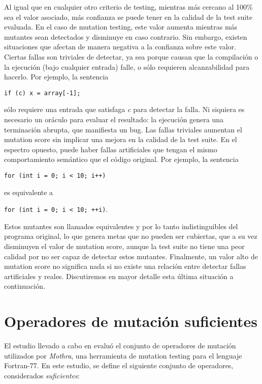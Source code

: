 Al igual que en cualquier otro criterio de testing, mientras m\'as cercano al 100\% sea el valor asociado, m\'as confianza se puede tener en la calidad de la test suite evaluada. En el caso de mutation testing, este valor aumenta mientras m\'as mutantes sean detectados y disminuye en caso contrario. Sin embargo, existen situaciones que afectan de manera negativa a la confianza sobre este valor. Ciertas fallas son triviales de detectar, ya sea porque causan que la compilaci\'on o la ejecuci\'on (bajo cualquier entrada) falle, o s\'olo requieren alcanzabilidad para hacerlo. Por ejemplo, la sentencia

 \lstinline|if (c) x = array[-1];| 

\noindent
s\'olo requiere una entrada que satisfaga \emph{c} para detectar la falla. Ni siquiera es necesario un or\'aculo para evaluar el resultado: la ejecuci\'on genera una terminaci\'on abrupta, que manifiesta un bug. Las fallas triviales aumentan el mutation score sin implicar una mejora en la calidad de la test suite. En el espectro opuesto, puede haber fallas artificiales que tengan el mismo comportamiento sem\'antico que el c\'odigo original. Por ejemplo, la sentencia

 \lstinline|for (int i = 0; i < 10; i++)| 

\noindent
es equivalente a 

\lstinline|for (int i = 0; i < 10; ++i)|. 

\noindent
Estos mutantes son llamados equivalentes y por lo tanto indistinguibles del programa original, lo que genera metas que no pueden ser cubiertas, que a su vez disminuyen el valor de mutation score, aunque la test suite no tiene una peor calidad por no ser capaz de detectar estos mutantes. Finalmente, un valor alto de mutation score no significa nada si no existe una relaci\'on entre detectar fallas artificiales y reales. Discutiremos en mayor detalle esta \'ultima situaci\'on a continuaci\'on.

\pagebreak
\section{Operadores de mutaci\'on suficientes}
\label{sec:preliminares.mutation.sufficient}

El estudio llevado a cabo en \cite{bibliography.mutation.selection.Offutt96} evalu\'o el conjunto de operadores de mutaci\'on utilizados por \emph{Mothra}, una herramienta de mutation testing para el lenguaje Fortran-77. En este estudio, se define el siguiente conjunto de operadores, considerados \emph{suficientes}:

